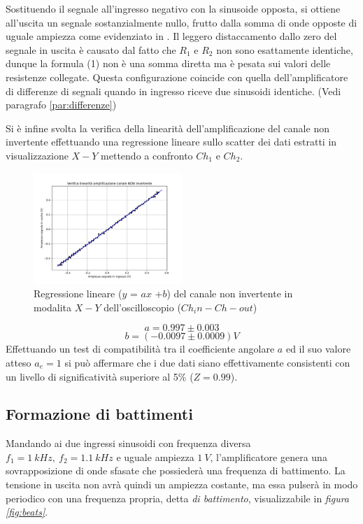 \documentclass[journal]{IEEEtran}
\begin{document}
Sostituendo il segnale all'ingresso negativo con la sinusoide opposta, si ottiene all'uscita un segnale sostanzialmente nullo, frutto dalla somma di onde opposte di uguale ampiezza come evidenziato in \texit{\ref{fig:Mixer2}}. Il leggero distaccamento dallo zero del segnale in uscita è causato dal fatto che $R_1$ e $R_2$ non sono esattamente identiche, dunque la formula (1) non è una somma diretta ma è pesata sui valori delle resistenze collegate. Questa configurazione coincide con quella dell'amplificatore di differenze di segnali quando in ingresso riceve due sinusoidi identiche. (Vedi paragrafo \ref{par:differenze})




 Si è infine svolta la verifica della linearità dell'amplificazione del canale non invertente effettuando una regressione lineare sullo scatter dei dati estratti in visualizzazione $X-Y$ mettendo a confronto $Ch_1$ e $Ch_2$.
 \begin{figure}[H]%
\begin {center}
\includegraphics[width=0.50\textwidth]{analysis/output/OPA-linfit-non-inv.pdf}
\caption{Regressione lineare ($y$ = $ax$ +$b$) del canale non invertente in modalita $X-Y$ dell'oscilloscopio ($Ch_in-Ch-out$)}
\label{fig:lin-non-inv}
\end {center}
\end{figure}
\[a = 0.997 \pm 0.003 \]
\[b = (-0.0097 \pm 0.0009) V \]
Effettuando un test di compatibilità tra il coefficiente angolare $a$ ed il suo valore atteso $a_e = 1$ si può affermare che i due dati  siano effettivamente consistenti con un livello di significatività superiore al 5\% ($Z=0.99$).
\subsection{\textbf{Formazione di battimenti}}
Mandando ai due ingressi sinusoidi con frequenza diversa $f_1 = 1\ kHz, \ f_2 = 1.1\ kHz$ e uguale ampiezza $1 \ V$, l'amplificatore genera una sovrapposizione di onde sfasate che possiederà una frequenza di battimento. La tensione in uscita non avrà quindi un ampiezza costante, ma essa pulserà in modo periodico con una frequenza propria, detta \textit{di battimento}, visualizzabile in \textit{figura \ref{fig:beats}}.
\end{document}

